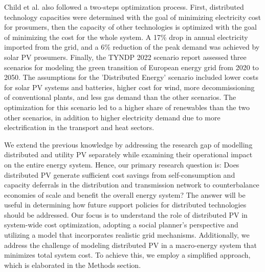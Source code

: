 \documentclass[review]{elsarticle}
\begin{document}
	Child et al. \cite{child_2019} also followed a two-steps optimization process. First, distributed technology capacities were determined with the goal of minimizing electricity cost for prosumers, then the capacity of other technologies is optimized with the goal of minimizing the cost for the whole system. A 17\% drop in annual electricity imported from the grid, and a 6\% reduction of the peak demand was achieved by solar PV prosumers. Finally, the TYNDP 2022 scenario report \cite{TYNDP}  assessed three scenarios for modeling the green transition of European energy grid from 2020 to 2050. The assumptions for the 'Distributed Energy' scenario included lower costs for solar PV systems and batteries, higher cost for wind, more decommissioning of conventional plants, and less gas demand than the other scenarios. The optimization for this scenario led to a higher share of renewables than the two other scenarios, in addition to higher electricity demand due to more electrification in the transport and heat sectors.
	
	We extend the previous knowledge by addressing the research gap of modelling distributed and utility PV separately while examining their operational impact on the entire energy system. Hence, our primary research question is: Does distributed PV generate sufficient cost savings from self-consumption and capacity deferrals in the distribution and transmission network to counterbalance economies of scale and benefit the overall energy system? The answer will be useful in determining how future support policies for distributed technologies should be addressed. Our focus is to understand the role of distributed PV in system-wide cost optimization, adopting a social planner's perspective and utilizing a model that incorporates realistic grid mechanisms. Additionally, we address the challenge of modeling distributed PV in a macro-energy system that minimizes total system cost. To achieve this, we employ a simplified approach, which is elaborated in the Methods section.
	
\end{document}
